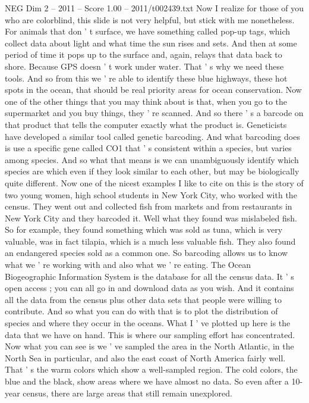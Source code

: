 \begin{textsample}{NEG Dim 2 – 2011 – Score 1.00 – 2011/t002439.txt}
Now I realize for those of you who are colorblind, this slide is not very helpful, but stick with me nonetheless.
For animals that don ' t surface, we have something called pop-up tags, which collect data about light and what time the sun rises and sets.
And then at some period of time it pops up to the surface and, again, relays that data back to shore.
Because GPS doesn ' t work under water.
That ' s why we need these tools.
And so from this we ' re able to identify these blue highways, these hot spots in the ocean, that should be real priority areas for ocean conservation.
Now one of the other things that you may think about is that, when you go to the supermarket and you buy things, they ' re scanned.
And so there ' s a barcode on that product that tells the computer exactly what the product is.
Geneticists have developed a similar tool called genetic barcoding.
And what barcoding does is use a specific gene called CO1 that ' s consistent within a species, but varies among species.
And so what that means is we can unambiguously identify which species are which even if they look similar to each other, but may be biologically quite different.
Now one of the nicest examples I like to cite on this is the story of two young women, high school students in New York City, who worked with the census.
They went out and collected fish from markets and from restaurants in New York City and they barcoded it.
Well what they found was mislabeled fish.
So for example, they found something which was sold as tuna, which is very valuable, was in fact tilapia, which is a much less valuable fish.
They also found an endangered species sold as a common one.
So barcoding allows us to know what we ' re working with and also what we ' re eating.
The Ocean Biogeographic Information System is the database for all the census data.
It ' s open access ; you can all go in and download data as you wish.
And it contains all the data from the census plus other data sets that people were willing to contribute.
And so what you can do with that is to plot the distribution of species and where they occur in the oceans.
What I ' ve plotted up here is the data that we have on hand.
This is where our sampling effort has concentrated.
Now what you can see is we ' ve sampled the area in the North Atlantic, in the North Sea in particular, and also the east coast of North America fairly well.
That ' s the warm colors which show a well-sampled region.
The cold colors, the blue and the black, show areas where we have almost no data.
So even after a 10-year census, there are large areas that still remain unexplored.

\end{textsample}
